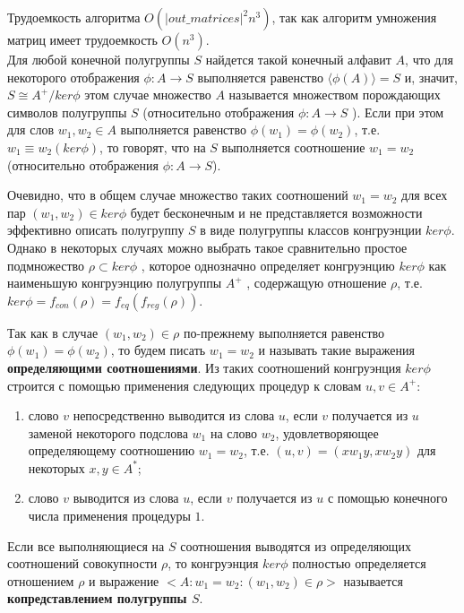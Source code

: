 \documentclass[bachelor, och, labwork]{shiza}
\begin{document}
Трудоемкость алгоритма $O(|out\_matrices|^2n^3)$, так как алгоритм умножения 
матриц имеет трудоемкость $O(n^3)$.\\


Для любой конечной полугруппы $S$ найдется такой конечный алфавит $A$, что для
некоторого отображения $\phi : A \rightarrow S$ выполняется равенство
$\langle \phi(A) \rangle = S$ и, значит, $S \cong A^+/ ker \phi$ этом случае
множество $A$ называется множеством порождающих символов полугруппы $S$
(относительно отображения $\phi : A \rightarrow S$ ). Если при этом для слов
$w_1,w_2 \in A$ выполняется равенство $\phi(w_1) = \phi(w_2)$, т.е. $w_1 \equiv w_2(ker\phi)$, 
то говорят, что на $S$ выполняется соотношение $w_1 = w_2$ (относительно отображения $\phi : A \rightarrow S$).

Очевидно, что в общем случае множество таких соотношений $w_1 = w_2$ для всех пар 
$(w_1, w_2) \in ker\phi$ будет бесконечным и не представляется возможности эффективно 
описать полугруппу $S$ в виде полугруппы классов конгруэнции $ker\phi$. Однако в 
некоторых случаях можно выбрать такое сравнительно простое подмножество $\rho \subset ker\phi$ , 
которое однозначно определяет конгруэнцию $ker\phi$ как наименьшую конгруэнцию
полугруппы $A^+$ , содержащую отношение $\rho$, т.е. $ker\phi = f_{con}(\rho) = f_{eq}(f_{reg}(\rho))$.

Так как в случае $(w_1, w_2) \in \rho$ по-прежнему выполняется равенство $\phi(w_1) = \phi(w_2)$, 
то будем писать $w_1 = w_2$ и называть такие выражения \textbf{определяющими соотношениями}. 
Из таких соотношений конгруэнция $ker\phi$ строится с помощью применения следующих процедур к
словам $u,v \in A^+$:


\begin{enumerate}
      \item слово $v$ непосредственно выводится из слова $u$, если $v$
      получается из $u$ заменой некоторого подслова $w_1$ на слово $w_2$,
      удовлетворяющее определяющему соотношению $w_1 = w_2$, т.е. $(u, v) =
      (xw_1y, xw_2y)$ для некоторых $x, y \in A^*$;
      \item слово $v$ выводится из слова $u$, если $v$ получается из $u$ с
      помощью конечного числа применения процедуры $1$.
\end{enumerate}
    
Если все выполняющиеся на $S$ соотношения выводятся из определяющих соотношений 
совокупности $\rho$, то конгруэнция $ker\phi$ полностью определяется отношением 
$\rho$ и выражение $<A: {w_1 = w_2 : (w_1, w_2) \in \rho}>$ называется 
\textbf{копредставлением полугруппы $S$}.
\end{document}
